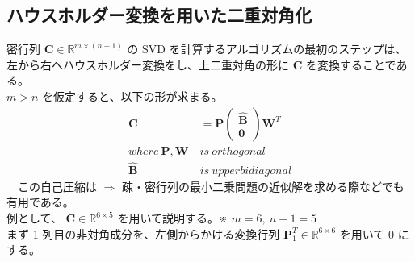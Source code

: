 \documentclass[a4paper,10pt]{jarticle}
\begin{document}
\subsection{ハウスホルダー変換を用いた二重対角化}
\label{sec:org34d8ecc}
密行列 \(\bm{C}\in\mathbb{R}^{m\times(n+1)}\) の SVD を計算するアルゴリズムの最初のステップは、左から右へハウスホルダー変換をし、上二重対角の形に \(\bm{C}\) を変換することである。\\
 \(m > n\) を仮定すると、以下の形が求まる。\\

\begin{align*}
\bm{C} &= \bm{P}\begin{pmatrix}\hat{\bm{B}}\\\bm{0}\end{pmatrix}\bm{W}^T\\
where\ \bm{P}, \bm{W} \ &is\ orthogonal\\
      \hat{\bm{B}} \ &is\ upper bidiagonal
\end{align*}
　この自己圧縮は \(\Rightarrow\) 疎・密行列の最小二乗問題の近似解を求める際などでも有用である。\\
例として、 \(\bm{C}\in\mathbb{R}^{6 \times 5}\) を用いて説明する。※ \(m = 6,\ n + 1 = 5\)\\
まず 1 列目の非対角成分を、左側からかける変換行列 \(\bm{P}^T_1\in\mathbb{R}^{6\times6}\) を用いて 0 にする。\\
\end{document}
